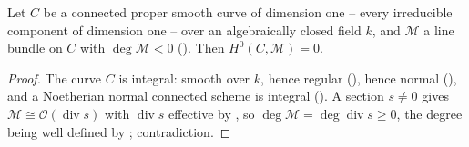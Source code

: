 \begin{lemma}
\label{lem:pcb-negative-degree-no-sections}
Let \(C\) be a connected proper smooth curve of dimension one -- every
irreducible component of dimension one -- over an algebraically closed
field \(k\), and \(\mathcal M\) a line bundle on \(C\) with
\(\deg\mathcal M<0\) ().  Then
\(H^0(C,\mathcal M)=0\).
\end{lemma}
\begin{proof}
The curve \(C\) is integral: smooth over \(k\), hence regular
(), hence normal
(), and a Noetherian normal connected
scheme is integral ().
A section \(s\neq0\) gives
\(\mathcal M\cong\mathcal O(\operatorname{div}s)\) with
\(\operatorname{div}s\) effective by
, so
\(\deg\mathcal M=\deg\operatorname{div}s\geq0\), the degree being
well defined by ; contradiction.
\end{proof}

